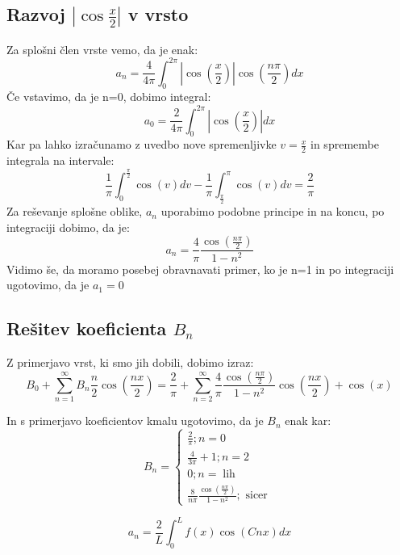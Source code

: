 \documentclass[11pt, a4paper]{article}
\theoremstyle{definition}
\theoremstyle{example}
\theoremstyle{izrek}
\begin{document}
\subsection{Razvoj $|\cos \frac{x}{2}|$ v vrsto}
Za splošni člen vrste vemo, da je enak: 
\begin{equation}
\label{eq:Eq26}
a_n=\frac{4}{4 \pi}\int_{0}^{2\pi} |\cos\left(\frac{x}{2}\right)|\cos\left(\frac{n\pi}{2}\right) dx
\end{equation}
Če vstavimo, da je n=0, dobimo integral:
$$a_0=\frac{2}{4 \pi}\int_{0}^{2\pi} |\cos\left(\frac{x}{2}\right)| dx$$
Kar pa lahko izračunamo z uvedbo nove spremenljivke $v=\frac{x}{2}$ in spremembe integrala na intervale:
\begin{equation}
\label{eq:Eq27}
\frac{1}{\pi}\int_{0}^{\frac{\pi}{2}}\cos(v)dv-\frac{1}{\pi}\int_{\frac{\pi}{2}}^{\pi}\cos(v)dv=\frac{2}{\pi}
\end{equation}
Za reševanje splošne oblike, $a_n$ uporabimo podobne principe in na koncu, po integraciji dobimo, da je:
\begin{equation}
\label{eq:Eq28}
a_n=\frac{4}{\pi}\frac{\cos\left(\frac{n\pi}{2}\right)}{1-n^2}\end{equation}
Vidimo še, da moramo posebej obravnavati primer, ko je n=1 in po integraciji ugotovimo, da je $a_1=0$

\subsection{Rešitev koeficienta $B_n$}
Z primerjavo vrst, ki smo jih dobili, dobimo izraz: 
\begin{equation}
\label{eq:Eq29}
B_0+ \sum_{n=1}^{\infty} B_n \frac{n}{2} \cos\left(\frac{nx}{2}\right)=\frac{2}{\pi}+\sum_{n=2}^{\infty} \frac{4}{\pi}\frac{\cos\left(\frac{n\pi}{2}\right)}{1-n^2}\cos\left(\frac{nx}{2}\right)+\cos(x)
\end{equation}

In s primerjavo koeficientov kmalu ugotovimo, da je $B_n$ enak kar:
\begin{equation}
B_{n}=\left\{\begin{array}{l}
\frac{2}{\pi} ; n=0 \\
\frac{4}{3 \pi}+1 ; n=2 \\
0 ; n=\operatorname{lih} \\
\frac{8}{n \pi} \frac{\cos \left(\frac{n\pi}{2}\right)}{1-n^{2}} ; \text { sicer }
\end{array}\right.
\end{equation}

$$a_n=\frac{2}{L} \int_{0}^{L} f(x)\cos(Cnx) dx$$
\end{document}
